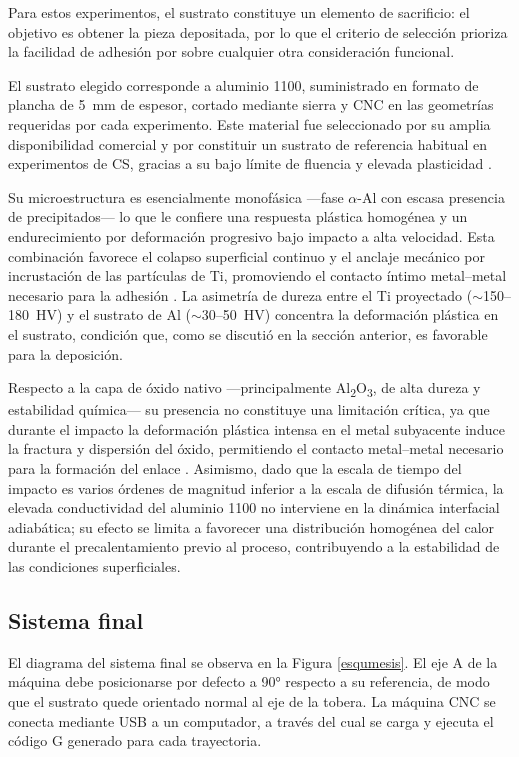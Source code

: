 Para estos experimentos, el sustrato constituye un elemento de sacrificio:
el objetivo es obtener la pieza depositada, por lo que el criterio de
selección prioriza la facilidad de adhesión por sobre cualquier otra
consideración funcional.

El sustrato elegido corresponde a aluminio 1100, suministrado en formato
de plancha de 5~mm de espesor, cortado mediante sierra y CNC en las
geometrías requeridas por cada experimento. Este material fue seleccionado
por su amplia disponibilidad comercial y por constituir un sustrato de
referencia habitual en experimentos de CS, gracias a su bajo límite de
fluencia y elevada plasticidad \cite{Yin2014substrate}.

Su microestructura es esencialmente monofásica ---fase $\alpha$-Al con
escasa presencia de precipitados--- lo que le confiere una respuesta
plástica homogénea y un endurecimiento por deformación progresivo bajo
impacto a alta velocidad. Esta combinación favorece el colapso superficial
continuo y el anclaje mecánico por incrustación de las partículas de Ti,
promoviendo el contacto íntimo metal--metal necesario para la adhesión
\cite{Binder2011}. La asimetría de dureza entre el Ti proyectado
($\sim$150--180~HV) y el sustrato de Al ($\sim$30--50~HV)
\cite{Callister2018} concentra la deformación plástica en el sustrato,
condición que, como se discutió en la sección anterior, es favorable para
la deposición.

Respecto a la capa de óxido nativo ---principalmente
Al\textsubscript{2}O\textsubscript{3}, de alta dureza y estabilidad
química--- su presencia no constituye una limitación crítica, ya que
durante el impacto la deformación plástica intensa en el metal subyacente
induce la fractura y dispersión del óxido, permitiendo el contacto
metal--metal necesario para la formación del enlace \cite{Assadi2003}.
Asimismo, dado que la escala de tiempo del impacto es varios órdenes de
magnitud inferior a la escala de difusión térmica, la elevada conductividad
del aluminio 1100 no interviene en la dinámica interfacial adiabática; su
efecto se limita a favorecer una distribución homogénea del calor durante
el precalentamiento previo al proceso, contribuyendo a la estabilidad
de las condiciones superficiales.

\subsection{Sistema final}

El diagrama del sistema final se observa en la Figura \ref{esqumesis}. El eje A de la máquina debe posicionarse por defecto a 90° respecto a su referencia, de modo que el sustrato quede orientado normal al eje de la tobera. La máquina CNC se conecta mediante USB a un computador, a través del cual se carga y ejecuta el código G generado para cada trayectoria. 

